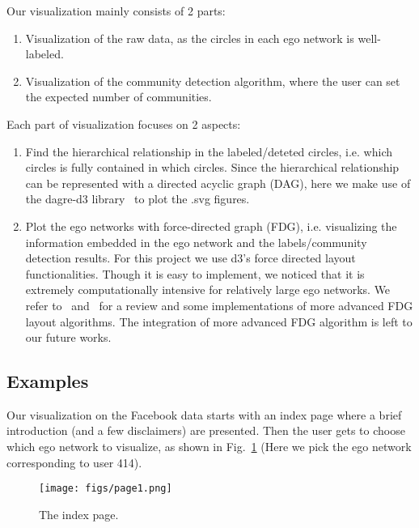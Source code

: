 Our visualization mainly consists of 2 parts:
\begin{enumerate}
    \item Visualization of the raw data, as the circles in each ego network is
    well-labeled.
    \item Visualization of the community detection algorithm, where the user can
    set the expected number of communities.
\end{enumerate}
Each part of visualization focuses on 2 aspects:
\begin{enumerate}
    \item Find the hierarchical relationship in the labeled/deteted circles,
    i.e. which circles is fully contained in which circles. Since the
    hierarchical relationship can be represented with a directed acyclic graph
    (DAG), here we make use of the dagre-d3 library~\cite{dagred3} to plot the
    .svg figures.
    \item Plot the ego networks with force-directed graph (FDG), i.e.
    visualizing the information embedded in the ego network and the
    labels/community detection results. For this project we use d3's force
    directed layout functionalities. Though it is easy to implement, we noticed
    that it is extremely computationally intensive for relatively large ego
    networks. We refer to~\cite{kobourov2004force} and~\cite{ogdf} for a review
    and some implementations of more advanced FDG layout algorithms. The integration of
    more advanced FDG algorithm is left to our future works.
\end{enumerate}

\subsection{Examples}
Our visualization on the Facebook data starts with an index page where a brief
introduction (and a few disclaimers) are presented. Then the user gets to choose
which ego network to visualize, as shown in Fig.~\ref{fig:page1} (Here we pick
the ego network corresponding to user 414).

\begin{figure}[!t]
    \centering
    \texttt{[image: figs/page1.png]}
    \caption{The index page.}
    \label{fig:page1}
\end{figure}

